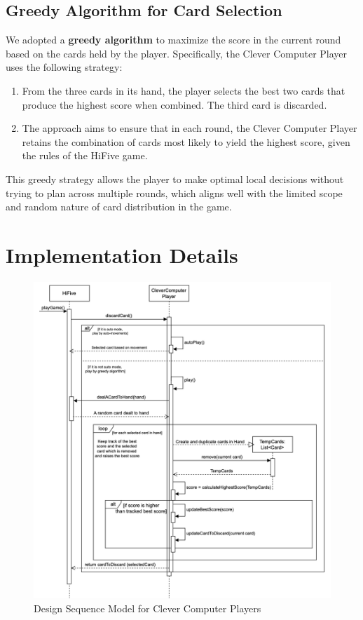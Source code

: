 \documentclass[a4paper, 12pt]{report}
\begin{document}
    \subsection{Greedy Algorithm for Card Selection}
    
    We adopted a \textbf{greedy algorithm} to maximize the score in the current round based on the cards held by the player. Specifically, the Clever Computer Player uses the following strategy:

    \begin{enumerate}
        \item From the three cards in its hand, the player selects the best two cards that produce the highest score when combined. The third card is discarded.
        \item The approach aims to ensure that in each round, the Clever Computer Player retains the combination of cards most likely to yield the highest score, given the rules of the HiFive game.
    \end{enumerate}
    
    This greedy strategy allows the player to make optimal local decisions without trying to plan across multiple rounds, which aligns well with the limited scope and random nature of card distribution in the game.

    \section{Implementation Details}

    \begin{figure}[htbp]
        \centering
        \includegraphics[width=1\linewidth]{Clever.png}
        \caption{Design Sequence Model for Clever Computer Players}
        \label{fig:enter-label}
    \end{figure}
    
\end{document}
